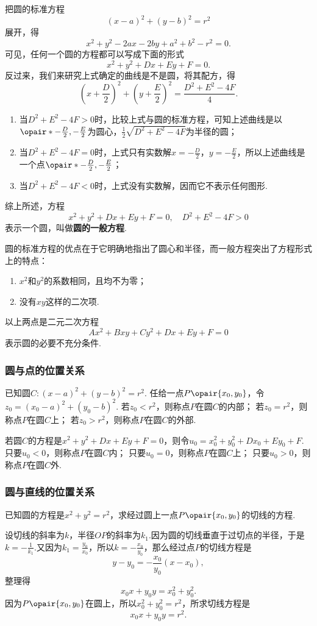 把圆的标准方程\[
(x-a)^2+(y-b)^2 = r^2
\]展开，得\[
x^2 + y^2 - 2ax - 2by + a^2 + b^2 - r^2 = 0.
\]可见，任何一个圆的方程都可以写成下面的形式\[
x^2 + y^2 + Dx + Ey + F = 0.
\]反过来，我们来研究上式确定的曲线是不是圆，将其配方，得\[
\left(x+\frac{D}{2}\right)^2+\left(y+\frac{E}{2}\right)^2 = \frac{D^2+E^2-4F}{4}.
\]\begin{enumerate}
\item 当\(D^2+E^2-4F > 0\)时，比较上式与圆的标准方程，可知上述曲线是以\(\opair*{-\frac{D}{2},-\frac{E}{2}}\)为圆心，\(\frac{1}{2} \sqrt{D^2+E^2-4F}\)为半径的圆；
\item 当\(D^2+E^2-4F = 0\)时，上式只有实数解\(x=-\frac{D}{2}\)，\(y=-\frac{E}{2}\)，所以上述曲线是一个点\(\opair*{-\frac{D}{2},-\frac{E}{2}}\)；
\item 当\(D^2+E^2-4F < 0\)时，上式没有实数解，因而它不表示任何图形.
\end{enumerate}
综上所述，方程\begin{equation}
x^2 + y^2 + Dx + Ey + F = 0,
\quad
D^2+E^2-4F > 0
\end{equation}表示一个圆，叫做\textbf{圆的一般方程}.

圆的标准方程的优点在于它明确地指出了圆心和半径，而一般方程突出了方程形式上的特点：\begin{enumerate}
\item \(x^2\)和\(y^2\)的系数相同，且均不为零；
\item 没有\(xy\)这样的二次项.
\end{enumerate}以上两点是二元二次方程\[
A x^2 + B xy + C y^2 + D x + E y + F = 0
\]表示圆的必要不充分条件.

\subsubsection{圆与点的位置关系}
已知圆\(C: (x-a)^2+(y-b)^2=r^2\).
任给一点\(P\opair{x_0,y_0}\)，令\(z_0 = (x_0-a)^2+(y_0-b)^2\).
若\(z_0 < r^2\)，则称点\(P\)在圆\(C\)的内部；
若\(z_0 = r^2\)，则称点\(P\)在圆\(C\)上；
若\(z_0 > r^2\)，则称点\(P\)在圆\(C\)的外部.

若圆\(C\)的方程是\(x^2+y^2+Dx+Ey+F=0\)，则令\(u_0 = x_0^2+y_0^2+Dx_0+Ey_0+F\).
只要\(u_0 < 0\)，则称点\(P\)在圆\(C\)内；
只要\(u_0 = 0\)，则称点\(P\)在圆\(C\)上；
只要\(u_0 > 0\)，则称点\(P\)在圆\(C\)外.

\subsubsection{圆与直线的位置关系}
\begin{example}
已知圆的方程是\(x^2+y^2 = r^2\)，求经过圆上一点\(P\opair{x_0,y_0}\)的切线的方程.
\begin{solution}
设切线的斜率为\(k\)，半径\(OP\)的斜率为\(k_1\).因为圆的切线垂直于过切点的半径，于是\(k = -\frac{1}{k_1}\).又因为\(k_1 = \frac{y_0}{x_0}\)，所以\(k = -\frac{x_0}{y_0}\)，那么经过点\(P\)的切线方程是\[
y-y_0 = -\frac{x_0}{y_0} (x-x_0),
\]整理得\[
x_0 x + y_0 y = x_0^2 + y_0^2.
\]因为\(P\opair{x_0,y_0}\)在圆上，所以\(x_0^2 + y_0^2 = r^2\)，所求切线方程是\begin{equation}
x_0 x + y_0 y = r^2.
\end{equation}
\end{solution}
\end{example}

